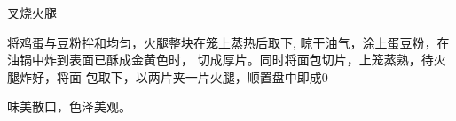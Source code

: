 \begin{recipe}{叉烧火腿}

\ingredients


\cooking

将鸡蛋与豆粉拌和均匀，火腿整块在笼上蒸热后取下, 晾干油气，涂上蛋豆粉，在油锅中炸到表面已酥成金黄色时， 切成厚片。同时将面包切片，上笼蒸熟，待火腿炸好，将面 包取下，以两片夹一片火腿，顺置盘中即成0

\notes

味美散口，色泽美观。

\end{recipe}

